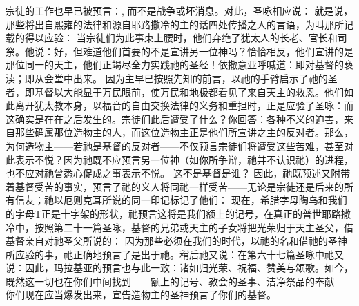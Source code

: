 宗徒的工作也早已被预言：, 而不是战争或坏消息。对此，圣咏相应说： 就是说，那些将出自熙雍的法律和源自耶路撒冷的主的话四处传播之人的言语，为叫那所记载的得以应验： 当宗徒们为此事束上腰时，他们弃绝了犹太人的长老、官长和司祭。他说：好，但难道他们首要的不是宣讲另一位神吗？恰恰相反，他们宣讲的是那位同一的天主，他们正竭尽全力实践祂的圣经！依撒意亚呼喊道：即对基督的亵渎；即从会堂中出来。 因为主早已按照先知的前言，以祂的手臂启示了祂的圣者，即基督以大能显于万民眼前，使万民和地极都看见了来自天主的救恩。他们如此离开犹太教本身，以福音的自由交换法律的义务和重担时，正是应验了圣咏：而这确实是在在之后发生的。宗徒们此后遭受了什么？你回答：各种不义的迫害，来自那些确属那位造物主的人，而这位造物主正是他们所宣讲之主的反对者。那么，为何造物主——若祂是基督的反对者——不仅预言宗徒们将遭受这些苦难，甚至对此表示不悦？因为祂既不应预言另一位神（如你所争辩，祂并不认识祂）的进程，也不应对祂曾悉心促成之事表示不悦。 这不是基督是谁？ 因此，祂既预述又附带着基督受苦的事实，预言了祂的义人将同祂一样受苦——无论是宗徒还是后来的所有信友；祂以厄则克耳所说的同一印记标记了他们： 现在，希腊字母陶乌和我们的字母T正是十字架的形状，祂预言这将是我们额上的记号，在真正的普世耶路撒冷中，按照第二十一篇圣咏，基督的兄弟或天主的子女将把光荣归于天主圣父，借基督亲自对祂圣父所说的： 因为那些必须在我们的时代，以祂的名和借祂的圣神所应验的事，祂正确地预言了是出于祂。稍后祂又说：在第六十七篇圣咏中祂又说：因此，玛拉基亚的预言也与此一致：诸如归光荣、祝福、赞美与颂歌。如今，既然这一切也在你们中间找到——额上的记号、教会的圣事、洁净祭品的奉献——你们现在应当爆发出来，宣告造物主的圣神预言了你们的基督。\par

